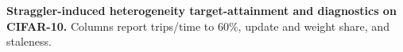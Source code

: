 \begin{table}[H]
\centering
\scriptsize
\caption{\textbf{Straggler-induced heterogeneity target-attainment and diagnostics on CIFAR-10.} Columns report trips/time to \(60\%\), update and weight share, and staleness.}
\label{tab:network_main_target_matrix}


\end{table}
